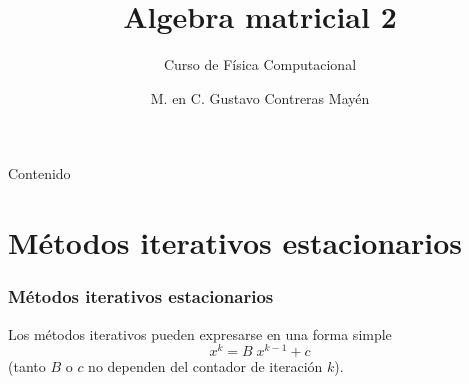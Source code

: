 


\normalfont
\usepackage{ccfonts}%
\usepackage[T1]{fontenc}%
\renewcommand{\rmdefault}{cmr}%
\linespread{1.3}
\title{Algebra matricial 2}
\subtitle{Curso de Física Computacional}
\author[]{M. en C. Gustavo Contreras Mayén}
\newcommand{\seti}{\setcounter{saveenumi}{\value{enumi}}}
\newcommand{\conti}{\setcounter{enumi}{\value{saveenumi}}}

\newcommand{\localtextbulletone}{\textcolor{gray}{\raisebox{.45ex}{\rule{.6ex}{.6ex}}}}
\maketitle
\fontsize{14}{14}\selectfont
{}
\begin{frame}{Contenido}
\tableofcontents[pausesections]
\end{frame}
\section{Métodos iterativos estacionarios}
\begin{frame}
\frametitle{Métodos iterativos estacionarios}
Los métodos iterativos pueden expresarse en una forma simple
\begin{equation}
x^{k} = B \; x^{k - 1} + c
\end{equation}
(tanto $B$ o $c$ no dependen del contador de iteración $k$). 
\end{frame}
